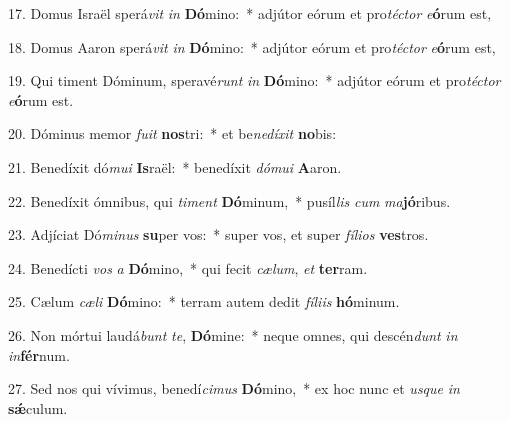 17. Domus Israël sperá\textit{vit} \textit{in} \textbf{Dó}mino:~*  adjútor eórum et pro\textit{téc}\textit{tor} \textit{e}\textbf{ó}rum est,\

18. Domus Aaron sperá\textit{vit} \textit{in} \textbf{Dó}mino:~*  adjútor eórum et pro\textit{téc}\textit{tor} \textit{e}\textbf{ó}rum est,\

19. Qui timent Dóminum, speravé\textit{runt} \textit{in} \textbf{Dó}mino:~*  adjútor eórum et pro\textit{téc}\textit{tor} \textit{e}\textbf{ó}rum est.\

20. Dóminus memor \textit{fu}\textit{it} \textbf{nos}tri:~*  et be\textit{ne}\textit{dí}\textit{xit} \textbf{no}bis:\

21. Benedíxit dó\textit{mu}\textit{i} \textbf{Is}raël:~*  benedíxit \textit{dó}\textit{mu}\textit{i} \textbf{A}aron.\

22. Benedíxit ómnibus, qui \textit{ti}\textit{ment} \textbf{Dó}minum,~*  pusíl\textit{lis} \textit{cum} \textit{ma}\textbf{jó}ribus.\

23. Adjíciat Dó\textit{mi}\textit{nus} \textbf{su}per vos:~*  super vos, et super \textit{fí}\textit{li}\textit{os} \textbf{ves}tros.\

24. Benedícti \textit{vos} \textit{a} \textbf{Dó}mino,~*  qui fecit \textit{cæ}\textit{lum}, \textit{et} \textbf{ter}ram.\

25. Cælum \textit{cæ}\textit{li} \textbf{Dó}mino:~*  terram autem dedit \textit{fí}\textit{li}\textit{is} \textbf{hó}minum.\

26. Non mórtui laudá\textit{bunt} \textit{te}, \textbf{Dó}mine:~*  neque omnes, qui descén\textit{dunt} \textit{in} \textit{in}\textbf{fér}num.\

27. Sed nos qui vívimus, benedí\textit{ci}\textit{mus} \textbf{Dó}mino,~*  ex hoc nunc et \textit{us}\textit{que} \textit{in} \textbf{sǽ}culum.\

